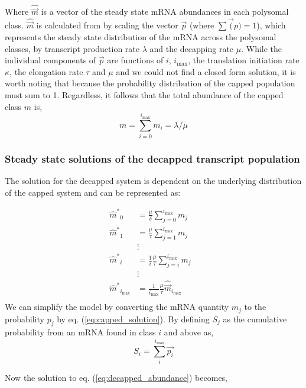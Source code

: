 \documentclass[a4,center,fleqn]{NAR}
\newcommand{\imax}{\ensuremath{{i_{\max}}}\xspace}
\newcommand{\mhat}{\ensuremath{\hat{m}}\xspace}
\newcommand{\mhatstar}{\ensuremath{\mhat^{*}}\xspace}
\newcommand{\mvec}{\ensuremath{\vec{m}}\xspace}
\newcommand{\mvechat}{\ensuremath{\hat{\mvec}}\xspace}
\newcommand{\msum}{\ensuremath{m}\xspace}
\begin{document}
Where \mvechat is a vector of the steady state mRNA abundances in each polysomal class.
\mvechat is calculated from by scaling  the vector $\vec{p}$ (where $\sum \vec(p) = 1$), which represents the steady state distribution of the mRNA across the polysomal classes, by transcript production rate $\lambda$ and the decapping rate $\mu$.
While the individual components of $\vec{p}$ are functions of $i$, \imax, the translation initiation rate $\kappa$, the elongation rate $\tau$ and $\mu$ and we could not find a closed form solution, it is worth noting that because the probability distribution of the capped population must sum to 1.
Regardless, it follows that the total abundance of the capped class \msum is,
\begin{equation}\label{eq:capped_sum}
\msum = \sum_{i = 0} ^\imax m_i = \lambda/\mu
\end{equation}

\subsubsection{Steady state solutions of the decapped transcript population}

The solution for the decapped system is dependent on the underlying distribution of the capped system and can be represented as:

\begin{align}\label{eq:decapped_abundance}
\mhatstar_0  &= \frac{\mu}{\delta}\sum_{j=0}^{\imax}m_{j} \\ \nonumber
\mhatstar_1  &= \frac{\mu}{\tau}\sum_{j=1}^{\imax}m_{j}  \\ \nonumber
& \vdots & \\ \nonumber
\mhatstar_i  &= \frac{1}{i}\frac{\mu}{\tau}\sum_{j=i}^{\imax}m_{j}  \\ \nonumber
& \vdots & \\ \nonumber
\mhatstar_{\imax}  &= \frac{1}{\imax}\frac{\mu}{\tau} \mvechat_{\imax}   \\ \nonumber
\end{align}
We can simplify the model by converting the mRNA quantity $m_{j}$ to the probability $p_{j}$ by eq. (\ref{eq:capped_solution}).
By defining $S_{j}$ as the cumulative probability from an mRNA found in class $i$ and above as,
\begin{equation}
		S_{i} = \sum_{i}^{\imax}\vec{p_{i}}
\end{equation}

Now the solution to eq. (\ref{eq:decapped_abundance}) becomes,
\end{document}

